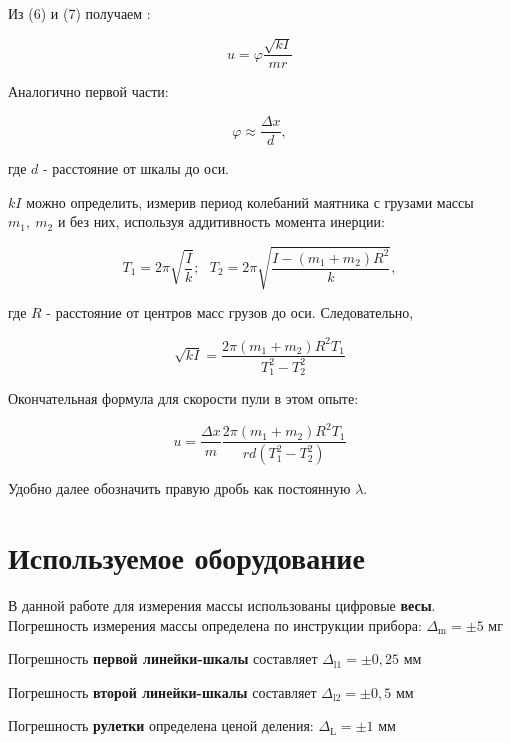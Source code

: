 \documentclass{article}
\begin{document}
Из (6) и (7) получаем :

\begin{equation}
	u = \varphi \frac{\sqrt{kI}}{mr}
\end{equation}

Аналогично первой части:

\begin{equation}
	\varphi \approx \frac{\Delta x}{d},
\end{equation}

где $d$ - расстояние от шкалы до оси.

$kI$ можно определить, измерив период колебаний маятника с грузами массы $m_1, \ m_2$ и без них, используя аддитивность момента инерции:

\begin{equation}
	T_1 = 2 \pi \sqrt{\frac{I}{k}}; \ \ \ T_2 = 2 \pi \sqrt{\frac{I - (m_1 + m_2)R^2}{k}},
\end{equation}

где $R$ - расстояние от центров масс грузов до оси. Следовательно,

\begin{equation}
	\sqrt{kI} = \dfrac{2 \pi (m_1 + m_2) R^2 T_1}{T_1^2 - T_2^2}
\end{equation}

Окончательная формула для скорости пули в этом опыте:

\begin{equation}
	u = \frac{\Delta x}{m}\dfrac{2 \pi (m_1 + m_2) R^2 T_1}{r d (T_1^2 - T_2^2)}
\end{equation}

Удобно далее обозначить правую дробь как постоянную $\lambda$. 

\section*{Используемое оборудование}

\hspace{4mm} В данной работе для измерения массы использованы цифровые \textbf{весы}. Погрешность измерения массы определена по инструкции прибора: $\Delta_{\text{m}} = \pm 5$ мг

Погрешность \textbf{первой линейки-шкалы} составляет $\Delta_{\text{l1}} = \pm 0,25$ мм 

Погрешность \textbf{второй линейки-шкалы} составляет $\Delta_{\text{l2}} = \pm 0,5$ мм 

Погрешность \textbf{рулетки} определена ценой деления: $\Delta_{\text{L}} = \pm 1$ мм
\end{document}
